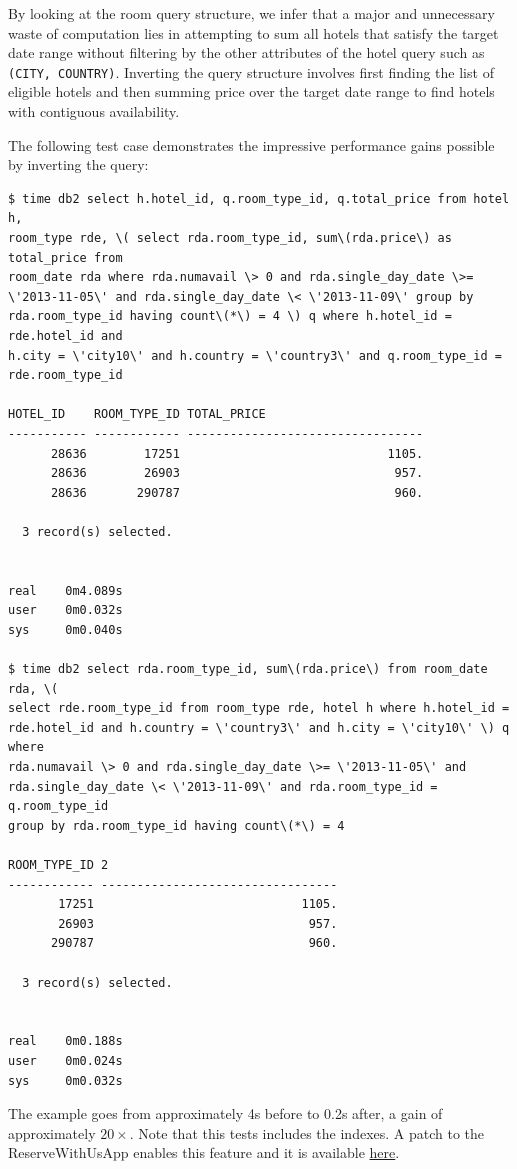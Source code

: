 \documentclass[letterpaper]{article}%
\begin{document}
By looking at the room query structure, we infer that a major and unnecessary
waste of computation lies in attempting to sum all hotels that satisfy the
target date range without filtering by the other attributes of the hotel query
such as \texttt{(CITY, COUNTRY)}. Inverting the query structure involves first
finding the list of eligible hotels and then summing price over the target date
range to find hotels with contiguous availability.

The following test case demonstrates the impressive performance gains possible
by inverting the query:
\begin{Verbatim}[frame=single]
$ time db2 select h.hotel_id, q.room_type_id, q.total_price from hotel h,
room_type rde, \( select rda.room_type_id, sum\(rda.price\) as total_price from
room_date rda where rda.numavail \> 0 and rda.single_day_date \>=
\'2013-11-05\' and rda.single_day_date \< \'2013-11-09\' group by
rda.room_type_id having count\(*\) = 4 \) q where h.hotel_id = rde.hotel_id and
h.city = \'city10\' and h.country = \'country3\' and q.room_type_id =
rde.room_type_id

HOTEL_ID    ROOM_TYPE_ID TOTAL_PRICE
----------- ------------ ---------------------------------
      28636        17251                             1105.
      28636        26903                              957.
      28636       290787                              960.

  3 record(s) selected.


real    0m4.089s
user    0m0.032s
sys     0m0.040s

$ time db2 select rda.room_type_id, sum\(rda.price\) from room_date rda, \(
select rde.room_type_id from room_type rde, hotel h where h.hotel_id =
rde.hotel_id and h.country = \'country3\' and h.city = \'city10\' \) q where
rda.numavail \> 0 and rda.single_day_date \>= \'2013-11-05\' and
rda.single_day_date \< \'2013-11-09\' and rda.room_type_id = q.room_type_id
group by rda.room_type_id having count\(*\) = 4

ROOM_TYPE_ID 2
------------ ---------------------------------
       17251                             1105.
       26903                              957.
      290787                              960.

  3 record(s) selected.


real    0m0.188s
user    0m0.024s
sys     0m0.032s
\end{Verbatim}
The example goes from approximately 4s before to 0.2s after, a gain of
approximately $20\times$. Note that this tests includes the indexes. A patch
to the ReserveWithUsApp enables this feature and it is available
\href{%
https://github.com/blr246/adbs-reservewithus/commit/4662879ee3443dcf48e1a692aed957891edd8e8c%
}{here}.
\end{document}
